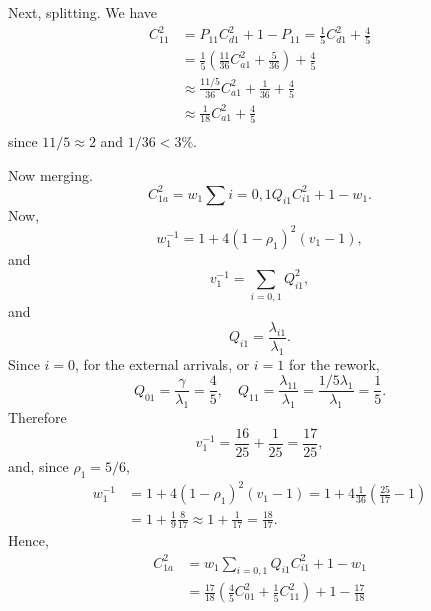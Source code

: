 \begin{question}
\begin{solution}
Next, splitting. We have
\begin{equation*}
  \begin{split}
  C_{11}^2 
&= P_{11}C_{d1}^2 + 1 - P_{11} = \frac{1}{5}C_{d1}^2 + \frac 45 \\
&=\frac{1}{5}\left(\frac{11}{36}C_{a1}^2 + \frac{5}{36}\right) + \frac 45 \\    
&\approx\frac{11/5}{36} C_{a1}^2 + \frac{1}{36} + \frac 45 \\
&\approx\frac{1}{18} C_{a1}^2 + \frac 45 \\
  \end{split}
\end{equation*}
since $11/5 \approx 2$ and $1/36 < 3\%$. 

Now merging.
\begin{equation*}
  C_{1a}^2 = w_1 \sum{i=0,1} Q_{i1} C_{i1}^2 + 1 - w_1.
\end{equation*}
Now, 
\begin{equation*}
  w_1^{-1} = 1 + 4(1-\rho_1)^2 (v_1-1),
\end{equation*}
and
\begin{equation*}
  v_1^{-1}=\sum_{i=0,1} Q_{i1}^2,
\end{equation*}
and 
\begin{equation*}
  Q_{i1} = \frac{\lambda_{i1}}{\lambda_1}.
\end{equation*}
Since $i=0$, for the external arrivals, or $i=1$ for the rework,
\begin{equation*}
  Q_{01} = \frac{\gamma}{\lambda_1} = \frac 45, \quad Q_{11}=\frac{\lambda_{11}}{\lambda_1} = \frac{1/5 \lambda_1 }{\lambda_1} = \frac 15.
\end{equation*}
Therefore
\begin{equation*}
  v_1^{-1}= \frac{16}{25}+\frac1{25} = \frac{17}{25},
\end{equation*}
and, since $\rho_1 = 5/6$,
\begin{equation*}
  \begin{split}
  w_1^{-1} 
&= 1 + 4(1-\rho_1)^2 (v_1-1) = 1 + 4\frac1{36}\left(\frac{25}{17}-1\right) \\
&= 1 + \frac1{9}\frac{8}{17} \approx 1 + \frac1{17} =\frac{18}{17}.
  \end{split}
\end{equation*}
Hence,
\begin{equation*}
  \begin{split}
  C_{1a}^2 
&= w_1 \sum_{i=0,1} Q_{i1} C_{i1}^2 + 1 - w_1 \\
&= \frac{17}{18} \left(\frac 45 C_{01}^2 + \frac 1 5 C_{11}^2 \right) + 1 - \frac{17}{18}\\

\end{split}
\end{equation*}
\end{solution}
\end{question}
